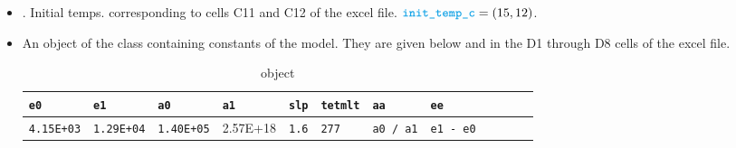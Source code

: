 \begin{enumerate}
\begin{itemize}
\item {}. Initial temps. corresponding to cells C11 and C12 
of the excel file. $\vari{init\_{temp\_c}} = (15, 12)$.

\item {} An object of the class  containing 
constants of the model. They are given below and in 
the D1 through D8 cells of the excel
file.
\iffalse
\begin{align*}
\vari{const} 
&=  \begin{bmatrix}
           \vari{e0} \\
           \vari{e1} \\
           \vari{a0}\\
           \vari{a1}\\
           \vari{slp}\\
           \vari{tetmlt}\\
           \vari{aa}\\
           \vari{ee}
         \end{bmatrix}  =
      \begin{bmatrix}
           4.15E+03 \\
           1.29E+04\\
           1.40E+05 \\
           2.57E+18\\
           1.6\\
           277\\
           \vari{a0} / \vari{a1}\\
           \vari{e1} - \vari{e0}
         \end{bmatrix}
\end{align*}
\fi

\begin{table}[!htb]
\caption{ object}
\begin{center}
    \begin{tabular}{| l | l | l | l | l | l| l| l| l | l | l | p{1cm} |}
     \hline
    \scriptsize{\texttt{e0}} & \scriptsize{\texttt{e1}} & \scriptsize{\texttt{a0}} & \scriptsize{\texttt{a1}} & \scriptsize{\texttt{slp}} & \scriptsize{\texttt{tetmlt}} & \scriptsize{\texttt{aa}} & \scriptsize{\texttt{ee}} \\ \hline
             \scriptsize{\texttt{4.15E+03}} & \scriptsize{\texttt{1.29E+04}} & \scriptsize{\texttt{1.40E+05}} & \scriptsize{2.57E+18} & \scriptsize{\texttt{1.6}} & \scriptsize{\texttt{277}} & \scriptsize{\texttt{a0 / a1}} & \scriptsize{\texttt{e1 - e0}}  \\ \hline
    \end{tabular}
\end{center}
 \label{table:None}
\end{table}


\end{itemize}
\end{enumerate}

